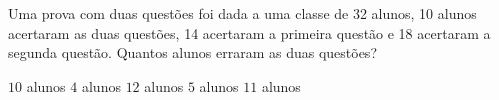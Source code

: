 \noindent\parbox{\linewidth}{

Uma prova com duas questões foi dada a uma classe de 32 alunos, 10 alunos acertaram as duas questões, 14 acertaram a primeira questão e 18 acertaram a segunda questão. Quantos alunos erraram as duas questões?

$10$ alunos
$4$ alunos
$12$ alunos
$5$ alunos
$11$ alunos



}


